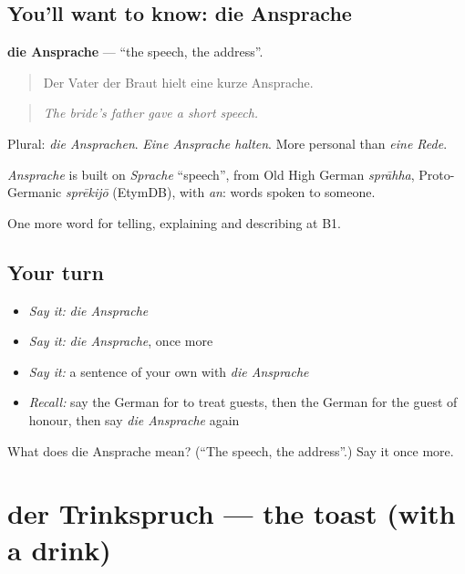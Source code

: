 \subsection*{You'll want to know: die Ansprache}
\textbf{die Ansprache} — \textquotedblleft{}the speech, the address\textquotedblright{}.

\begin{quote}
Der Vater der Braut hielt eine kurze Ansprache.
\end{quote}

\begin{quote}
\emph{The bride's father gave a short speech.}
\end{quote}

Plural: \emph{die Ansprachen}. \emph{Eine Ansprache halten}. More personal than \emph{eine Rede}.

\begin{cousinweb}
\emph{Ansprache} is built on \emph{Sprache} \textquotedblleft{}speech\textquotedblright{}, from Old High German \emph{sprāhha}, Proto-Germanic \emph{sprēkijō} (EtymDB), with \emph{an}: words spoken to someone.
\end{cousinweb}

\begin{grammarlens}[title={What you've built}]
One more word for telling, explaining and describing at B1.
\end{grammarlens}

\subsection*{Your turn}
\begin{itemize}
\raggedright
  \item \emph{Say it:} \emph{die Ansprache}
  \item \emph{Say it:} \emph{die Ansprache}, once more
  \item \emph{Say it:} a sentence of your own with \emph{die Ansprache}
  \item \emph{Recall:} say the German for to treat guests, then the German for the guest of honour, then say \emph{die Ansprache} again
\end{itemize}

\begin{tcolorbox}[breakable,colback=teal!4,colframe=teal!35!black,title={Before you move on}]
What does die Ansprache mean? (\textquotedblleft{}The speech, the address\textquotedblright{}.) Say it once more.
\end{tcolorbox}
\section[der Trinkspruch]{der Trinkspruch — the toast (with a drink)}

